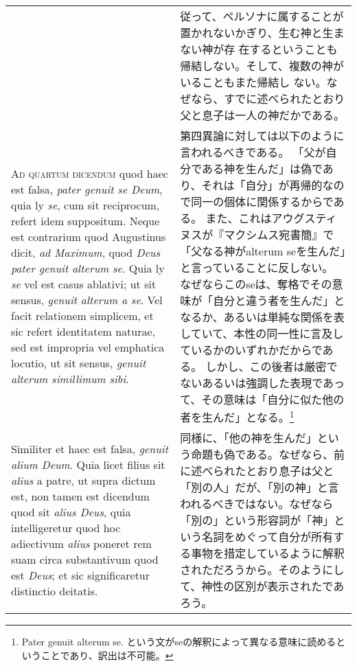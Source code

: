 \documentclass[10pt]{jsarticle} %
\begin{document}
\begin{longtable}{p{21em}p{21em}}
&

従って、ペルソナに属することが置かれないかぎり、生む神と生まない神が存
 在するということも帰結しない。そして、複数の神がいることもまた帰結し
 ない。なぜなら、すでに述べられたとおり父と息子は一人の神だかである。

\\



{\scshape Ad quartum dicendum} quod haec est falsa, \textit{pater genuit se Deum}, quia ly
\textit{se}, cum sit reciprocum, refert idem suppositum. Neque est contrarium
quod Augustinus dicit, \textit{ad Maximum}, quod \textit{Deus pater genuit alterum
se}. Quia ly \textit{se} vel est casus ablativi; ut sit sensus, \textit{genuit alterum a
se}. Vel facit relationem simplicem, et sic refert identitatem naturae,
sed est impropria vel emphatica locutio, ut sit sensus, \textit{genuit alterum
simillimum sibi}. 


&

第四異論に対しては以下のように言われるべきである。
「父が自分である神を生んだ」は偽であり、それは「自分」が再帰的なので同一の個体に関係するからである。
また、これはアウグスティヌスが『マクシムス宛書簡』で「父なる神がalterum
seを生んだ」と言っていることに反しない。
なぜならこのseは、奪格でその意味が「自分と違う者を生んだ」となるか、あるいは単純な関係を表していて、本性の同一性に言及しているかのいずれかだからである。
しかし、この後者は厳密でないあるいは強調した表現であって、その意味は「自分に似た他の者を生んだ」となる。\footnote{Pater
genuit alterum se.
という文がseの解釈によって異なる意味に読めるということであり、訳出は不可能。}

\\



Similiter et haec est falsa, \textit{genuit alium Deum}. Quia
licet filius sit \textit{alius} a patre, ut supra dictum est, non tamen est
dicendum quod sit \textit{alius Deus}, quia intelligeretur quod hoc adiectivum
\textit{alius} poneret rem suam circa substantivum quod est \textit{Deus}; et sic
significaretur distinctio deitatis. 


&

同様に、「他の神を生んだ」という命題も偽である。なぜなら、前に述べられたとおり息子は父と「別の人」だが、「別の神」と言われるべきではない。なぜなら「別の」という形容詞が「神」という名詞をめぐって自分が所有する事物を措定しているように解釈されただろうから。そのようにして、神性の区別が表示されたであろう。

\\



\end{longtable}
\end{document}
